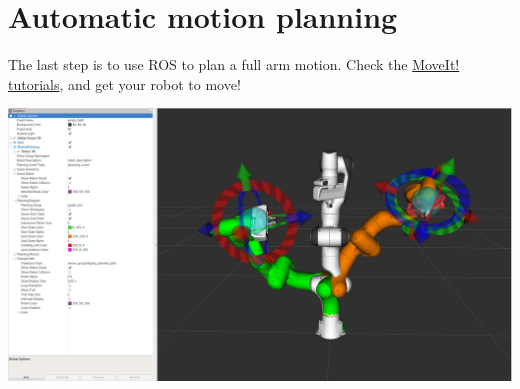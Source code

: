 \documentclass{instructions}
\begin{document}


\part{Automatic motion planning}

The last step is to use ROS to plan a full arm motion. Check the
\href{https://ros-planning.github.io/moveit_tutorials/}{MoveIt! tutorials}, and
get your robot to move!

\begin{center}
    \includegraphics[width=0.8\linewidth]{moveit}
\end{center}
\end{document}
